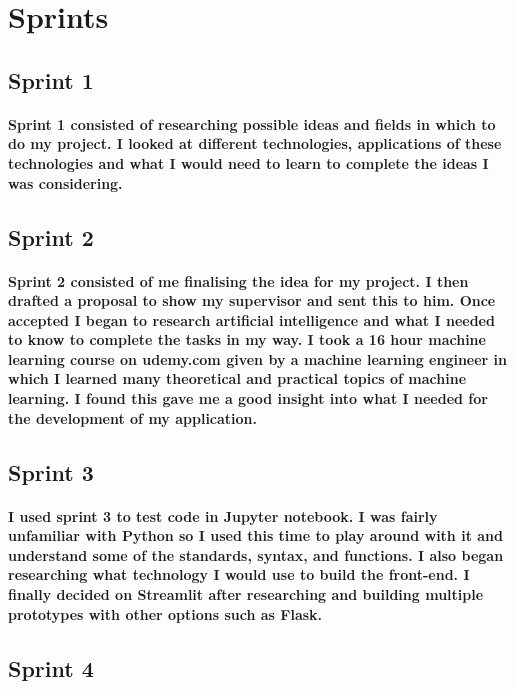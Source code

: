 \section{Sprints}
\subsection{Sprint 1}
\paragraph{Sprint 1 consisted of researching possible ideas and fields in which to do my project. I looked at different technologies, applications of these technologies and what I would need to learn to complete the ideas I was considering.}

\subsection{Sprint 2}
\paragraph{Sprint 2 consisted of me finalising the idea for my project. I then drafted a proposal to show my supervisor and sent this to him. Once accepted I began to research artificial intelligence and what I needed to know to complete the tasks in my way. I took a 16 hour machine learning course on udemy.com given by a machine learning engineer in which I learned many theoretical and practical topics of machine learning. I found this gave me a good insight into what I needed for the development of my application.\cite{udemyml}}

\subsection{Sprint 3}
\paragraph{I used sprint 3 to test code in Jupyter notebook. I was fairly unfamiliar with Python so I used this time to play around with it and understand some of the standards, syntax, and functions. I also began researching what technology I would use to build the front-end. I finally decided on Streamlit after researching and building multiple prototypes with other options such as Flask.}

\subsection{Sprint 4}

